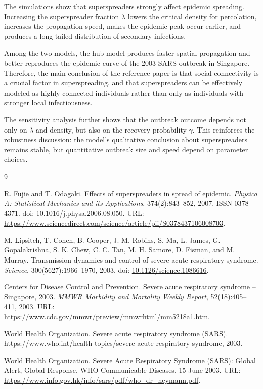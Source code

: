 \documentclass[11pt,a4paper]{article}
\begin{document}
The simulations show that superspreaders strongly affect epidemic spreading. Increasing the superspreader fraction $\lambda$ lowers the critical density for percolation, increases the propagation speed, makes the epidemic peak occur earlier, and produces a long-tailed distribution of secondary infections.

Among the two models, the hub model produces faster spatial propagation and better reproduces the epidemic curve of the 2003 SARS outbreak in Singapore. Therefore, the main conclusion of the reference paper is that social connectivity is a crucial factor in superspreading, and that superspreaders can be effectively modeled as highly connected individuals rather than only as individuals with stronger local infectiousness.

The sensitivity analysis further shows that the outbreak outcome depends not only on $\lambda$ and density, but also on the recovery probability $\gamma$. This reinforces the robustness discussion: the model's qualitative conclusion about superspreaders remains stable, but quantitative outbreak size and speed depend on parameter choices.

\begin{thebibliography}{9}

R. Fujie and T. Odagaki.
\newblock Effects of superspreaders in spread of epidemic.
\newblock \textit{Physica A: Statistical Mechanics and its Applications}, 374(2):843--852, 2007.
\newblock ISSN 0378-4371. doi: \href{https://doi.org/10.1016/j.physa.2006.08.050}{10.1016/j.physa.2006.08.050}.
\newblock URL: \url{https://www.sciencedirect.com/science/article/pii/S0378437106008703}.

M. Lipsitch, T. Cohen, B. Cooper, J. M. Robins, S. Ma, L. James, G. Gopalakrishna, S. K. Chew, C. C. Tan, M. H. Samore, D. Fisman, and M. Murray.
\newblock Transmission dynamics and control of severe acute respiratory syndrome.
\newblock \textit{Science}, 300(5627):1966--1970, 2003.
\newblock doi: \href{https://doi.org/10.1126/science.1086616}{10.1126/science.1086616}.

Centers for Disease Control and Prevention.
\newblock Severe acute respiratory syndrome -- Singapore, 2003.
\newblock \textit{MMWR Morbidity and Mortality Weekly Report}, 52(18):405--411, 2003.
\newblock URL: \url{https://www.cdc.gov/mmwr/preview/mmwrhtml/mm5218a1.htm}.

World Health Organization.
\newblock Severe acute respiratory syndrome (SARS).
\newblock \url{https://www.who.int/health-topics/severe-acute-respiratory-syndrome}, 2003.

World Health Organization.
\newblock Severe Acute Respiratory Syndrome (SARS): Global Alert, Global Response.
\newblock WHO Communicable Diseases, 15 June 2003.
\newblock URL: \url{https://www.info.gov.hk/info/sars/pdf/who_dr_heymann.pdf}.

\end{thebibliography}
\end{document}
